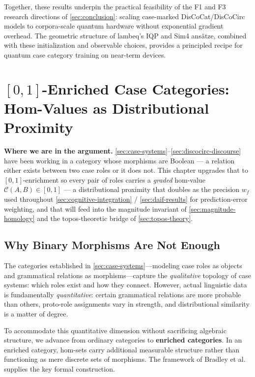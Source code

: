 \documentclass[
]{article}
\begin{document}
Together, these results underpin the practical feasibility of the F1 and
F3 research directions of \autoref{sec:conclusion}: scaling case-marked
DisCoCat/DisCoCirc models to corpora-scale quantum hardware without
exponential gradient overhead. The geometric structure of lambeq's IQP
and Sim4 ansätze, combined with these initialization and observable
choices, provides a principled recipe for quantum case category training
on near-term devices.

\newpage

\newpage

\section{\texorpdfstring{\([0,1]\)-Enriched Case Categories: Hom-Values
as Distributional
Proximity}{{[}0,1{]}-Enriched Case Categories: Hom-Values as Distributional Proximity}}\label{sec:enriched-categories}

\textbf{Where we are in the argument.}
\autoref{sec:case-systems}--\autoref{sec:discocirc-discourse} have been
working in a category whose morphisms are Boolean --- a relation either
exists between two case roles or it does not. This chapter upgrades that
to \([0,1]\)-enrichment so every pair of roles carries a \emph{graded}
hom-value \(\mathcal{C}(A, B) \in [0,1]\) --- a distributional proximity
that doubles as the precision \(w_f\) used throughout
\autoref{sec:cognitive-integration} / \autoref{sec:daif-results} for
prediction-error weighting, and that will feed into the magnitude
invariant of \autoref{sec:magnitude-homology} and the topos-theoretic
bridge of \autoref{sec:topos-theory}.

\subsection{Why Binary Morphisms Are Not
Enough}\label{why-binary-morphisms-are-not-enough}

The categories established in \autoref{sec:case-systems}---modeling case
roles as objects and grammatical relations as morphisms---capture the
\emph{qualitative} topology of case systems: which roles exist and how
they connect. However, actual linguistic data is fundamentally
\emph{quantitative}: certain grammatical relations are more probable
than others, proto-role assignments vary in strength, and distributional
similarity is a matter of degree.

To accommodate this quantitative dimension without sacrificing algebraic
structure, we advance from ordinary categories to \textbf{enriched
categories}. In an enriched category, hom-sets carry additional
measurable structure rather than functioning as mere discrete sets of
morphisms. The framework of Bradley et al.
\citeyearpar{fritz2021enriched} supplies the key formal construction.
\end{document}
